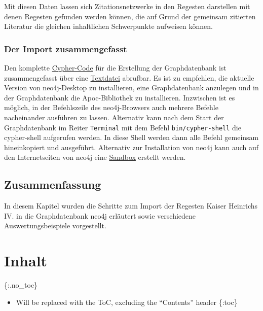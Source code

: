 \documentclass[ngerman,]{scrreprt}
\providecommand{\tightlist}{%
  \setlength{\itemsep}{0pt}\setlength{\parskip}{0pt}}
\begin{document}
Mit diesen Daten lassen sich Zitationsnetzwerke in den Regesten darstellen mit denen Regesten gefunden werden können, die auf Grund der gemeinsam zitierten Literatur die gleichen inhaltlichen Schwerpunkte aufweisen können.

\hypertarget{der-import-zusammengefasst}{%
\subsection{Der Import zusammengefasst}\label{der-import-zusammengefasst}}

Den komplette \href{cypher/20_cypher-Datenbankerstellung.txt}{Cypher-Code} für die Erstellung der Graphdatenbank ist zusammengefasst über eine \href{cypher/20_cypher-Datenbankerstellung.txt}{Textdatei} abrufbar. Es ist zu empfehlen, die aktuelle Version von neo4j-Desktop zu installieren, eine Graphdatenbank anzulegen und in der Graphdatenbank die Apoc-Bibliothek zu installieren. Inzwischen ist es möglich, in der Befehlszeile des neo4j-Browsers auch mehrere Befehle nacheinander ausführen zu lassen. Alternativ kann nach dem Start der Graphdatenbank im Reiter \texttt{Terminal} mit dem Befehl \texttt{bin/cypher-shell} die cypher-shell aufgerufen werden. In diese Shell werden dann alle Befehl gemeinsam hineinkopiert und ausgeführt. Alternativ zur Installation von neo4j kann auch auf den Internetseiten von neo4j eine \href{https://neo4j.com/lp/try-neo4j-sandbox}{Sandbox} erstellt werden.

\hypertarget{zusammenfassung-2}{%
\section{Zusammenfassung}\label{zusammenfassung-2}}

In diesem Kapitel wurden die Schritte zum Import der Regesten Kaiser Heinrichs IV. in die Graphdatenbank neo4j erläutert sowie verschiedene Auswertungsbeispiele vorgestellt.

\hypertarget{inhalt-4}{%
\chapter{Inhalt}\label{inhalt-4}}

\{:.no\_toc\}

\begin{itemize}
\tightlist
\item
  Will be replaced with the ToC, excluding the ``Contents'' header \{:toc\}
\end{itemize}
\end{document}
